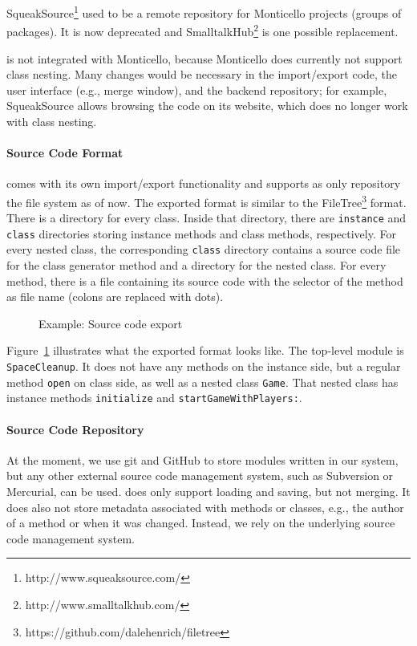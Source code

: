 SqueakSource\footnote{http://www.squeaksource.com/} used to be a remote repository for Monticello projects (groups of packages). It is now deprecated and SmalltalkHub\footnote{http://www.smalltalkhub.com/} is one possible replacement.

\msname is not integrated with Monticello, because Monticello does currently not support class nesting. Many changes would be necessary in the import/export code, the user interface (e.g., merge window), and the backend repository; for example, SqueakSource allows browsing the code on its website, which does no longer work with class nesting.

\paragraph{Source Code Format}
\msname comes with its own import/export functionality and supports as only repository the file system as of now. The exported format is similar to the FileTree\footnote{https://github.com/dalehenrich/filetree} format. There is a directory for every class. Inside that directory, there are \texttt{instance} and \texttt{class} directories storing instance methods and class methods, respectively. For every nested class, the corresponding \texttt{class} directory contains a source code file for the class generator method and a directory for the nested class. For every method, there is a file containing its source code with the selector of the method as file name (colons are replaced with dots).

\begin{figure}[!htp]
\caption{Example: Source code export}
\label{fig:impl_source_export}
\end{figure}

Figure~\ref{fig:impl_source_export} illustrates what the exported format looks like. The top-level module is \texttt{SpaceCleanup}. It does not have any methods on the instance side, but a regular method \texttt{open} on class side, as well as a nested class \texttt{Game}. That nested class has instance methods \texttt{initialize} and \texttt{startGameWithPlayers:}.

\paragraph{Source Code Repository}
At the moment, we use git and GitHub to store modules written in our system, but any other external source code management system, such as Subversion or Mercurial, can be used. \msname does only support loading and saving, but not merging. It does also not store metadata associated with methods or classes, e.g., the author of a method or when it was changed. Instead, we rely on the underlying source code management system.

